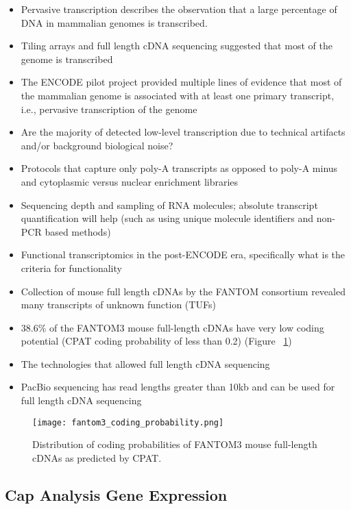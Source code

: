 \begin{itemize}
   \item Pervasive transcription describes the observation that a large percentage of DNA in mammalian genomes is transcribed.
   \item Tiling arrays and full length cDNA sequencing suggested that most of the genome is transcribed
   \item The ENCODE pilot project provided multiple lines of evidence that most of the mammalian genome is associated with at least one primary transcript, i.e., pervasive transcription of the genome
   \item Are the majority of detected low-level transcription due to technical artifacts and/or background biological noise?
   \item Protocols that capture only poly-A transcripts as opposed to poly-A minus and cytoplasmic versus nuclear enrichment libraries
   \item Sequencing depth and sampling of RNA molecules; absolute transcript quantification will help (such as using unique molecule identifiers and non-PCR based methods)
   \item Functional transcriptomics in the post-ENCODE era, specifically what is the criteria for functionality
   \item Collection of mouse full length cDNAs by the FANTOM consortium revealed many transcripts of unknown function (TUFs)
   \item 38.6\% of the FANTOM3 mouse full-length cDNAs have very low coding potential (CPAT coding probability of less than 0.2) (Figure ~\ref{fig:fantom3_coding_prob})
   \item The technologies that allowed full length cDNA sequencing
   \item PacBio sequencing has read lengths greater than 10kb and can be used for full length cDNA sequencing

\end{itemize}

\begin{figure}[h]
   \centering
   \texttt{[image: fantom3\_coding\_probability.png]}
   \caption[Coding probability of FANTOM3 mouse cDNAs]{Distribution of coding probabilities of FANTOM3 mouse full-length cDNAs as predicted by CPAT\cite{tang2014fantom3codingprob}.}
   \label{fig:fantom3_coding_prob}
\end{figure}

\subsection{Cap Analysis Gene Expression}

